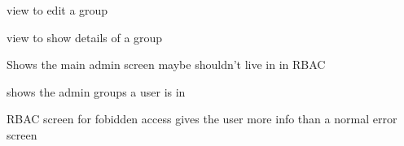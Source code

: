 \documentclass[letterpaper,10pt,english]{sphinxmanual}
\begin{document}
\begin{fulllineitems}
\label{\detokenize{rbac:rbac.views.group_edit}}
view to edit a group

\end{fulllineitems}


\begin{fulllineitems}
\label{\detokenize{rbac:rbac.views.group_view}}
view to show details of a group

\end{fulllineitems}


\begin{fulllineitems}
\label{\detokenize{rbac:rbac.views.main_admin_screen}}
Shows the main admin screen \sphinxhyphen{} maybe shouldn’t live in in RBAC

\end{fulllineitems}


\begin{fulllineitems}
\label{\detokenize{rbac:rbac.views.rbac_admin}}
shows the admin groups a user is in

\end{fulllineitems}


\begin{fulllineitems}
\label{\detokenize{rbac:rbac.views.rbac_forbidden}}
RBAC screen for fobidden access \sphinxhyphen{} gives the user more info than a
normal error screen

\end{fulllineitems}
\end{document}
